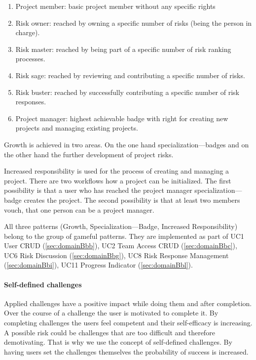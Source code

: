 \begin{enumerate}
	\item Project member: basic project member without any specific rights
	\item Risk owner: reached by owning a specific number of risks (being the person in charge).
	\item Risk master: reached by being part of a specific number of risk ranking processes.
	\item Risk sage: reached by reviewing and contributing a specific number of risks.
	\item Risk buster: reached by successfully contributing a specific number of risk responses.
	\item Project manager: highest achievable badge with right for creating new projects and managing existing projects.
\end{enumerate}

Growth is achieved in two areas. On the one hand specialization—badges and on the other hand the further development of project risks.

Increased responsibility is used for the process of creating and managing a project. There are two workflows how a project can be initialized. The first possibility is that a user who has reached the project manager specialization—badge creates the project. The second possibility is that at least two members vouch, that one person can be a project manager.

All three patterns (Growth, Specialization—Badge, Increased Responsibility) belong to the group of gameful patterns.
They are implemented as part of \ac{UC}1 User CRUD (\ref{sec:domainBbb}), \ac{UC}2 Team Access CRUD (\ref{sec:domainBbc}), \ac{UC}6 Risk Discussion (\ref{sec:domainBbg}), \ac{UC}8 Risk Response Management (\ref{sec:domainBbi}), \ac{UC}11 Progress Indicator (\ref{sec:domainBbl}).

\paragraph*{Self-defined challenges}

Applied challenges have a positive impact while doing them and after completion. Over the course of a challenge the user is motivated to complete it. By completing challenges the users feel competent and their self-efficacy is increasing. A possible risk could be challenges that are too difficult and therefore demotivating. That is why we use the concept of self-defined challenges. By having users set the challenges themselves the probability of success is increased.

